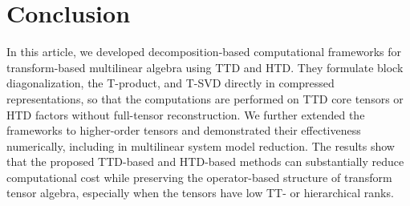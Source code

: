 \documentclass[onefignum,onetabnum]{siamart250211}
\begin{document}
\section{Conclusion} \label{sec:conclusion}


In this article, we developed decomposition-based computational frameworks for transform-based multilinear algebra using TTD and HTD. They formulate block diagonalization, the T-product, and T-SVD directly in compressed representations, so that the computations are performed on TTD core tensors or HTD factors without full-tensor reconstruction. We further extended the frameworks to higher-order tensors and demonstrated their effectiveness numerically, including in multilinear system model reduction. The results show that the proposed TTD-based and HTD-based methods can substantially reduce computational cost while preserving the operator-based structure of transform tensor algebra, especially when the tensors have low TT- or hierarchical ranks.
\end{document}
